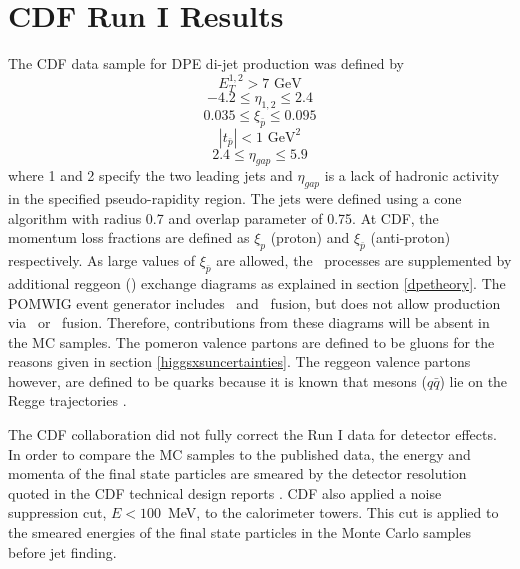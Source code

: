 \section{CDF Run I Results} \label{cdfrun1}


The CDF data sample for DPE di-jet production was defined \cite{Affolder:2000hd} by
\begin{equation} 
E_T^{1,2}  >  7 \text{ GeV} 
\end{equation}
\begin{equation}
-4.2 \leq \eta_{1,2} \leq 2.4
\end{equation}
\begin{equation}\label{run1kinematicsxipbar}
0.035 \leq   \xi_{\bar{p}} \leq 0.095 
\end{equation}
\begin{equation}\label{run1kinematicst}
|t_{\bar{p}}|  < 1\text{ GeV}^2 
\end{equation}
\begin{equation}
2.4 \leq \eta_{gap} \leq 5.9
\end{equation}
where 1 and 2 specify the two leading jets and $\eta_{gap}$ is a lack of hadronic activity in the specified pseudo-rapidity region.
The jets were defined using a cone algorithm with radius 0.7 and overlap parameter of 0.75. At CDF, the momentum loss fractions are defined as $\xi_p$ (proton) and $\xi_{\bar{p}}$ (anti-proton) respectively. 
As large values of $\xi_{\bar{p}}$ are allowed, the \Pom \Pom \, processes are supplemented by additional reggeon (\Reg) exchange diagrams as explained in section \ref{dpetheory}. The POMWIG event generator includes \Pom \Pom \, and \Reg \Reg \, fusion, but does not allow production via \Pom \Reg \, or \Reg \Pom \, fusion. Therefore, contributions from these diagrams will be absent in the MC samples. The pomeron valence partons are defined to be gluons for the reasons given in section \ref{higgsxsuncertainties}. The reggeon valence partons however, are defined to be quarks because it is known that mesons ($q\bar{q}$) lie on the Regge trajectories \cite{Forshaw:1997dc}.%

The CDF collaboration did not fully correct the Run I data for detector effects. In order to compare the MC samples to the published data, the energy and momenta of the final state particles are smeared by the detector resolution quoted in the CDF technical design reports \cite{Blair:1996kx,Bertolucci:1987zn}. CDF also applied a noise suppression cut, $E < 100$~MeV, to the calorimeter towers. This cut is applied to the smeared energies of the final state particles in the Monte Carlo samples before jet finding.

